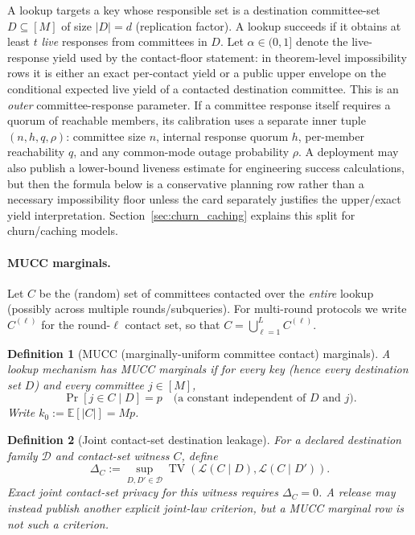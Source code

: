\documentclass[11pt]{article}
\newtheorem{definition}{Definition}
\newcommand{\E}{\mathbb{E}}
\begin{document}
A lookup targets a key whose responsible set is a destination committee-set $D\subseteq[M]$ of size $|D|=d$ (replication factor).
A lookup succeeds if it obtains at least $t$ \emph{live} responses from committees in $D$.
Let $\alpha\in(0,1]$ denote the live-response yield used by the contact-floor statement: in theorem-level impossibility rows it is either an exact per-contact yield or a public upper envelope on the conditional expected live yield of a contacted destination committee.
This is an \emph{outer} committee-response parameter. If a committee response itself requires a quorum of reachable members, its calibration uses a separate inner tuple $(n,h,q,\rho)$: committee size $n$, internal response quorum $h$, per-member reachability $q$, and any common-mode outage probability $\rho$.
A deployment may also publish a lower-bound liveness estimate for engineering success calculations, but then the formula below is a conservative planning row rather than a necessary impossibility floor unless the card separately justifies the upper/exact yield interpretation.
Section~\ref{sec:churn_caching} explains this split for churn/caching models.

\paragraph{MUCC marginals.}
Let $C$ be the (random) set of committees contacted over the \emph{entire} lookup (possibly across multiple rounds/subqueries).
For multi-round protocols we write $C^{(\ell)}$ for the round-$\ell$ contact set, so that $C=\bigcup_{\ell=1}^L C^{(\ell)}$.

\begin{definition}[MUCC (marginally-uniform committee contact) marginals]
\label{def:mucc}
A lookup mechanism has \emph{MUCC marginals} if for every key (hence every destination set $D$) and every committee $j\in[M]$,
\[\Pr[j\in C\mid D] = p\quad\text{(a constant independent of $D$ and $j$)}.\]
Write $k_0 := \E[|C|] = Mp$.
\end{definition}

\begin{definition}[Joint contact-set destination leakage]
\label{def:joint-contact-leakage}
For a declared destination family $\mathcal D$ and contact-set witness $C$, define
\[
\Delta_C := \sup_{D,D'\in\mathcal D}
  \operatorname{TV}\!\left(\mathcal L(C\mid D),\mathcal L(C\mid D')\right).
\]
Exact joint contact-set privacy for this witness requires $\Delta_C=0$.  A release may instead publish another explicit joint-law criterion, but a MUCC marginal row is not such a criterion.
\end{definition}
\end{document}
